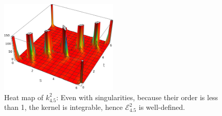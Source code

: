 \documentclass[../dissertation.tex]{subfiles}
\begin{document}
\begin{figure}[tpb]
    \centering
    \includegraphics[width=0.5\textwidth]{sections/tangentPointEnergyImgs/kHeatMap3}
    \caption{Heat map of $k_{4.5}^{2}$: Even with singularities, because their order is less than 1, the kernel is integrable, hence $\mathcal{E}_{4.5}^{2}$ is well-defined.}
    \label{fig: Low-Order Pole}
\end{figure}
\end{document}

